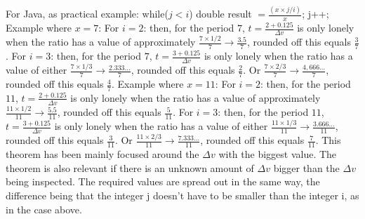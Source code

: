 \documentclass[12pt, a4paper]{article}
\begin{document}
For Java, as practical example: while($j < i$) double result $= \frac{(x\times j/i)}{x}$; j++;
\newline
\newline
Example where $x = 7$: \newline For $i=2$: then, for the period $7$, $t= \frac{2+0.125}{\Delta v}$ is only lonely when the ratio has a value of approximately $\frac{7\times 1/2}{7} \rightarrow \frac{3.5}{7}$, rounded off this equals $\frac{3}{7}$.
\newline
\newline
For $i=3$: then, for the period $7$, $t= \frac{3+0.125}{\Delta v}$ is only lonely when the ratio has a value of either $\frac{7\times 1/3}{7}\rightarrow\frac{2.333...}{7}$, rounded off this equals \underline{$\frac{2}{7}$}. Or $\frac{7\times 2/3}{7}\rightarrow\frac{4,666...}{7}$, rounded off this equals $\frac{4}{7}$. 
\newline
\newline
Example where $x = 11$: \newline For $i=2$: then, for the period $11$, $t= \frac{2+0.125}{\Delta v}$ is only lonely when the ratio has a value of approximately $\frac{11\times 1/2}{11} \rightarrow \frac{5.5}{11}$, rounded off this equals $\frac{5}{11}$.
\newline
\newline
For $i=3$: then, for the period $11$, $t= \frac{3+0.125}{\Delta v}$ is only lonely when the ratio has a value of either $\frac{11\times 1/3}{11}\rightarrow\frac{3.666...}{11}$, rounded off this equals $\frac{3}{11}$. Or $\frac{11\times 2/3}{11}\rightarrow\frac{7.333...}{11}$, rounded off this equals \underline{$\frac{7}{11}$}. 
\newline
\newline
This theorem has been mainly focused around the $\Delta v$ with the biggest value. The theorem is also relevant if there is an unknown amount of $\Delta v$ bigger than the $\Delta v$ being inspected. The required values are spread out in the same way, the difference being that the integer j doesn't have to be smaller than the integer i, as in the case above.
\end{document}
